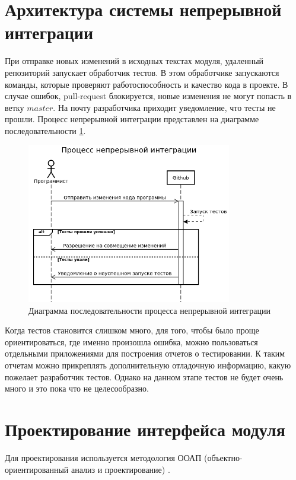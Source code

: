 \section{Архитектура системы непрерывной интеграции}

При отправке новых изменений в исходных текстах модуля,
удаленный репозиторий запускает обработчик тестов.
В этом обработчике запускаются команды, которые
проверяют работоспособность и качество кода в проекте.
В случае ошибок, pull-request блокируется, новые изменения не могут попасть
в ветку $ master $. На почту разработчика приходит уведомление, что
тесты не прошли. Процесс непрерывной интеграции представлен на диаграмме последовательности \ref{img:ci_sequence}.

\def\figurename{Рис}
\begin{figure}[t]
	\centering
	\includegraphics[height=7cm]{./img/ci_sequence.png}
	\caption{Диаграмма  последовательности процесса непрерывной интеграции}
	\label{img:ci_sequence}
\end{figure}

Когда тестов становится слишком много, для того, чтобы было
проще ориентироваться, где именно произошла ошибка,
можно пользоваться отдельными приложениями для построения
отчетов о тестировании. К таким отчетам можно прикреплять
дополнительную отладочную информацию, какую пожелает разработчик тестов.
Однако на данном этапе тестов не будет очень много и это пока что не целесообразно.

\section{Проектирование интерфейса модуля}

Для проектирования используется методология ООАП (объектно-ориентированный анализ и проектирование) \cite{маклафлин2013объектно}.

